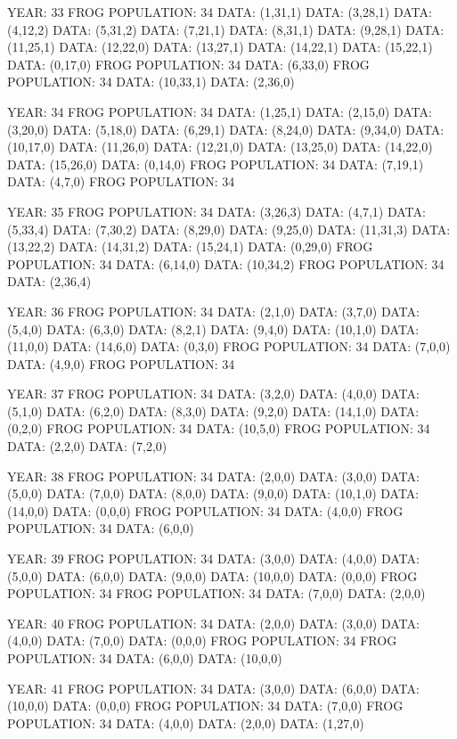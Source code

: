 \documentclass[12pt,a4paper]{article}
\begin{document}
{YEAR: 33
FROG POPULATION: 34
DATA: (1,31,1)
DATA: (3,28,1)
DATA: (4,12,2)
DATA: (5,31,2)
DATA: (7,21,1)
DATA: (8,31,1)
DATA: (9,28,1)
DATA: (11,25,1)
DATA: (12,22,0)
DATA: (13,27,1)
DATA: (14,22,1)
DATA: (15,22,1)
DATA: (0,17,0)
FROG POPULATION: 34
DATA: (6,33,0)
FROG POPULATION: 34
DATA: (10,33,1)
DATA: (2,36,0)

YEAR: 34
FROG POPULATION: 34
DATA: (1,25,1)
DATA: (2,15,0)
DATA: (3,20,0)
DATA: (5,18,0)
DATA: (6,29,1)
DATA: (8,24,0)
DATA: (9,34,0)
DATA: (10,17,0)
DATA: (11,26,0)
DATA: (12,21,0)
DATA: (13,25,0)
DATA: (14,22,0)
DATA: (15,26,0)
DATA: (0,14,0)
FROG POPULATION: 34
DATA: (7,19,1)
DATA: (4,7,0)
FROG POPULATION: 34

YEAR: 35
FROG POPULATION: 34
DATA: (3,26,3)
DATA: (4,7,1)
DATA: (5,33,4)
DATA: (7,30,2)
DATA: (8,29,0)
DATA: (9,25,0)
DATA: (11,31,3)
DATA: (13,22,2)
DATA: (14,31,2)
DATA: (15,24,1)
DATA: (0,29,0)
FROG POPULATION: 34
DATA: (6,14,0)
DATA: (10,34,2)
FROG POPULATION: 34
DATA: (2,36,4)

YEAR: 36
FROG POPULATION: 34
DATA: (2,1,0)
DATA: (3,7,0)
DATA: (5,4,0)
DATA: (6,3,0)
DATA: (8,2,1)
DATA: (9,4,0)
DATA: (10,1,0)
DATA: (11,0,0)
DATA: (14,6,0)
DATA: (0,3,0)
FROG POPULATION: 34
DATA: (7,0,0)
DATA: (4,9,0)
FROG POPULATION: 34

YEAR: 37
FROG POPULATION: 34
DATA: (3,2,0)
DATA: (4,0,0)
DATA: (5,1,0)
DATA: (6,2,0)
DATA: (8,3,0)
DATA: (9,2,0)
DATA: (14,1,0)
DATA: (0,2,0)
FROG POPULATION: 34
DATA: (10,5,0)
FROG POPULATION: 34
DATA: (2,2,0)
DATA: (7,2,0)

YEAR: 38
FROG POPULATION: 34
DATA: (2,0,0)
DATA: (3,0,0)
DATA: (5,0,0)
DATA: (7,0,0)
DATA: (8,0,0)
DATA: (9,0,0)
DATA: (10,1,0)
DATA: (14,0,0)
DATA: (0,0,0)
FROG POPULATION: 34
DATA: (4,0,0)
FROG POPULATION: 34
DATA: (6,0,0)

YEAR: 39
FROG POPULATION: 34
DATA: (3,0,0)
DATA: (4,0,0)
DATA: (5,0,0)
DATA: (6,0,0)
DATA: (9,0,0)
DATA: (10,0,0)
DATA: (0,0,0)
FROG POPULATION: 34
FROG POPULATION: 34
DATA: (7,0,0)
DATA: (2,0,0)

YEAR: 40
FROG POPULATION: 34
DATA: (2,0,0)
DATA: (3,0,0)
DATA: (4,0,0)
DATA: (7,0,0)
DATA: (0,0,0)
FROG POPULATION: 34
FROG POPULATION: 34
DATA: (6,0,0)
DATA: (10,0,0)

YEAR: 41
FROG POPULATION: 34
DATA: (3,0,0)
DATA: (6,0,0)
DATA: (10,0,0)
DATA: (0,0,0)
FROG POPULATION: 34
DATA: (7,0,0)
FROG POPULATION: 34
DATA: (4,0,0)
DATA: (2,0,0)
DATA: (1,27,0)

}
\end{document}
